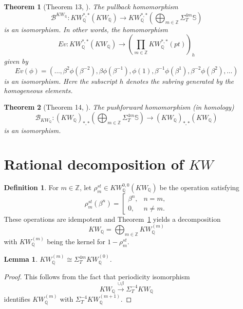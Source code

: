 \documentclass[a4paper,12pt,draft]{amsart}
\newtheorem{theorem}{Theorem}
\newtheorem{lemma}{Lemma}
\theoremstyle{definition}
\newtheorem{definition}{Definition}
\theoremstyle{remark}
\begin{document}
\begin{theorem}[Theorem 13, \cite{An15}] \label{thm:rational_stable_operations_KW}
The pullback homomorphism
\[
\mathcal{B}^{KW_{{\mathbb Q}}}\colon KW_{{\mathbb Q}}^{*,*}(KW_{{\mathbb Q}}) \to KW_{{\mathbb Q}}^{*,*}(\bigoplus_{m\in {{\mathbb Z}}} \Sigma^{4m}_T \mathbb{S})
\]
is an isomorphism. In other words, the homomorphism
\[
Ev\colon KW_{{\mathbb Q}}^{*,*}(KW_{{\mathbb Q}}) \to (\prod_{m\in {{\mathbb Z}}} KW_{{\mathbb Q}}^{*,*}(pt))_h
\]
given by 
\[
Ev(\phi)=\left(\dots,\beta^2\phi(\beta^{-2}),\beta\phi(\beta^{-1}),\phi(1),\beta^{-1}\phi(\beta^{1}),\beta^{-2}\phi(\beta^{2}),\dots \right)
\]
is an isomorphism. Here the subscript $h$ denotes the subring generated by the homogeneous elements.
\end{theorem}

\begin{theorem}[Theorem 14, \cite{An15}] \label{thm:cooperations}
The pushforward homomorphism (in homology)
\[
\mathcal{B}_{KW_{{\mathbb Q}}}\colon (KW_{{\mathbb Q}})_{*,*}(\bigoplus_{m\in {{\mathbb Z}}} \Sigma^{4m}_T \mathbb{S})\to (KW_{{\mathbb Q}})_{*,*}(KW_{{\mathbb Q}})
\]
is an isomorphism.
\end{theorem}

\section{Rational decomposition of $KW$}

\begin{definition}
For $m\in{{\mathbb Z}}$, let $\rho^{st}_m\in KW_{{\mathbb Q}}^{0,0}(KW_{{\mathbb Q}})$ be the operation satisfying
\[
\rho^{st}_{m}(\beta^{n})=
\left[
\begin{array}{ll}
\beta^{n}, & n=m,\\
0, & n\neq m.
\end{array}
\right.
\]
These operations are idempotent and Theorem~\ref{thm:rational_stable_operations_KW} yields a decomposition
\[
KW_{{\mathbb Q}}=\bigoplus_{m\in {{\mathbb Z}}} KW_{{\mathbb Q}}^{(m)} 
\]
with $KW_{{\mathbb Q}}^{(m)}$ being the kernel for  $1-\rho^{st}_{m}$. 
\end{definition}

\begin{lemma} \label{lm:iso_eigenspaces}
$KW^{(m)}_{{\mathbb Q}}\cong \Sigma^{4m}_T KW^{(0)}_{{\mathbb Q}}$.
\end{lemma}
\begin{proof}
This follows from the fact that periodicity isomorphism 
\[
KW_{{\mathbb Q}} \xrightarrow{\cup \beta} \Sigma^{-4}_T KW_{{\mathbb Q}}
\]
identifies $KW_{{\mathbb Q}}^{(m)}$ with   $\Sigma^{-4}_T KW_{{\mathbb Q}}^{(m+1)}$.
\end{proof}
\end{document}
